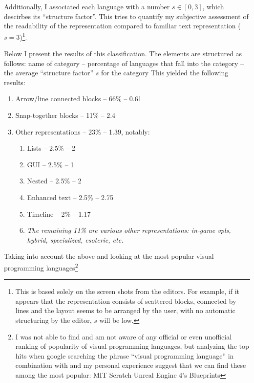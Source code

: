 Additionally, I associated each language with a number $s \in [0, 3]$, which
descirbes its ``structure factor''. This tries to quantify my subjective
assessment of the readability of the representation compared to familiar text
representation ($s = 3$)\footnote{This is based solely on the screen shots from
  the editors. For example, if it appears that the representation consists of
  scattered blocks, connected by lines and the layout seems to be arranged by
  the user, with no automatic structuring by the editor, $s$ will be low.}.

Below I present the results of this classification. The elements are structured
as follows: name of category -- percentage of languages that fall into the
category -- the average ``structure factor'' $s$ for the category This yielded
the following results:
\begin{enumerate}
    \item Arrow/line connected blocks -- 66\% -- 0.61
    \item Snap-together blocks -- 11\% -- 2.4
    \item Other representations -- 23\% -- 1.39, notably:
    \begin{enumerate}
        \item Lists -- 2.5\% -- 2
        \item GUI -- 2.5\% -- 1
        \item Nested -- 2.5\% -- 2
        \item Enhanced text -- 2.5\% -- 2.75
        \item Timeline -- 2\% -- 1.17
        \item \textit{The remaining 11\% are various other representations:
          in-game \acrshort{vpl}s, hybrid, specialized, esoteric, etc.}
    \end{enumerate}
\end{enumerate}

Taking into account the above and looking at the most popular visual programming
languages\footnote{I was not able to find and am not aware of any official or
  even unofficial ranking of popularity of visual programming languages, but
  analyzing the top hits when google searching the phrase ``visual programming
  language'' in combination with\cite{vpl_wikipedia} and my
  personal experience suggest that we can find these among the most popular: MIT
  Scratch Unreal Engine 4's Blueprints}

